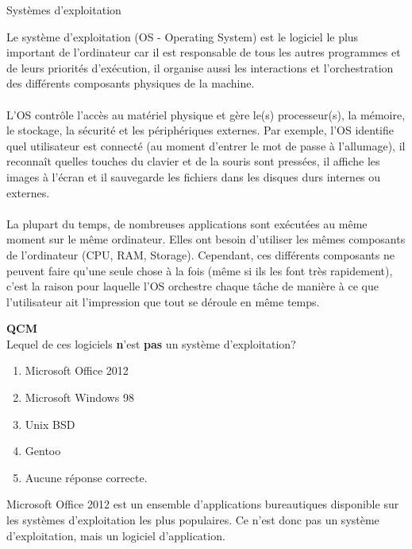 \begin{section}{Systèmes d'exploitation}
    
Le système d'exploitation (OS - Operating System) est le logiciel le plus important de l'ordinateur car il est responsable de tous les autres programmes et de leurs priorités d'exécution, il organise aussi les interactions et l'orchestration des différents composants physiques de la machine.
\\\\
L'OS contrôle l'accès au matériel physique et gère le(s) processeur(s), la mémoire, le stockage, la sécurité et les périphériques externes. Par exemple, l'OS identifie quel utilisateur est connecté (au moment d'entrer le mot de passe à l'allumage), il reconnaît quelles touches du clavier et de la souris sont pressées, il affiche les images à l'écran et il sauvegarde les fichiers dans les disques durs internes ou externes.
\\\\
La plupart du temps, de nombreuses applications sont exécutées au même moment sur le même ordinateur. Elles ont besoin d'utiliser les mêmes composants de l'ordinateur (CPU, RAM, Storage). Cependant, ces différents composants ne peuvent faire qu'une seule chose à la fois (même si ils les font très rapidement), c'est la raison pour laquelle l'OS orchestre chaque tâche de manière à ce que l'utilisateur ait l'impression que tout se déroule en même temps.
\\

    \begin{Exercice}[2 minutes]  \textbf{QCM}\\
    Lequel de ces logiciels \textbf{n}'est \textbf{pas} un système d'exploitation?
        \begin{enumerate}
            \item Microsoft Office 2012
            \item Microsoft Windows 98
            \item Unix BSD
            \item Gentoo
            \item Aucune réponse correcte.
        \end{enumerate}
    \end{Exercice}
    \begin{solution}
                Microsoft Office 2012 est un ensemble d'applications bureautiques disponible sur les systèmes d'exploitation les plus populaires.
		Ce n'est donc pas un système d'exploitation, mais un logiciel d'application. 
    \end{solution}


\end{section}
